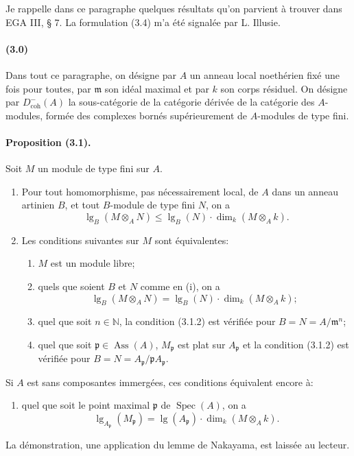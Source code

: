 \documentclass[10pt]{article}
\providecommand{\N}{\mathbb N}
\providecommand{\Spec}{\operatorname{Spec}}
\providecommand{\lgop}{\operatorname{lg}}
\begin{document}
Je rappelle dans ce paragraphe quelques résultats qu'on parvient à trouver dans EGA III, § 7. La formulation (3.4) m'a été signalée par L. Illusie.

\paragraph{(3.0)} Dans tout ce paragraphe, on désigne par $A$ un anneau local noethérien fixé une fois pour toutes, par $\mathfrak m$ son idéal maximal et par $k$ son corps résiduel. On désigne par $D^-_{\mathrm{coh}}(A)$ la sous-catégorie de la catégorie dérivée de la catégorie des $A$-modules, formée des complexes bornés supérieurement de $A$-modules de type fini.

\paragraph{Proposition (3.1).} Soit $M$ un module de type fini sur $A$.
\begin{enumerate}[label=(\roman*)]
\item Pour tout homomorphisme, pas nécessairement local, de $A$ dans un anneau artinien $B$, et tout $B$-module de type fini $N$, on a
\[
\tag{3.1.1}
\operatorname{lg}_B(M\otimes_A N)\le
\operatorname{lg}_B(N)\cdot\dim_k(M\otimes_A k).
\]
\item Les conditions suivantes sur $M$ sont équivalentes:
\begin{enumerate}[label=\alph*)]
\item $M$ est un module libre;
\item quels que soient $B$ et $N$ comme en (i), on a
\[
\tag{3.1.2}
\operatorname{lg}_B(M\otimes_A N)=
\operatorname{lg}_B(N)\cdot\dim_k(M\otimes_A k);
\]
\item quel que soit $n\in\N$, la condition (3.1.2) est vérifiée pour $B=N=A/\mathfrak m^n$;
\item quel que soit $\mathfrak p\in\operatorname{Ass}(A)$, $M_\mathfrak p$ est plat sur $A_\mathfrak p$ et la condition (3.1.2) est vérifiée pour $B=N=A_\mathfrak p/\mathfrak pA_\mathfrak p$.
\end{enumerate}
\end{enumerate}



Si $A$ est sans composantes immergées, ces conditions équivalent encore à:
\begin{enumerate}[label=\alph*),start=5]
\item quel que soit le point maximal $\mathfrak p$ de $\Spec(A)$, on a
\[
\tag{3.1.2'}
\lgop_{A_\mathfrak p}(M_\mathfrak p)=\lgop(A_\mathfrak p)\cdot
\dim_k(M\otimes_A k).
\]
\end{enumerate}
La démonstration, une application du lemme de Nakayama, est laissée au lecteur.
\end{document}
